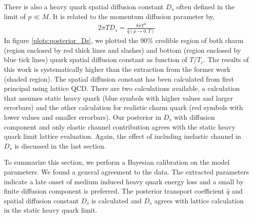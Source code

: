\documentclass[aps, prc, reprint, amsmath, groupedaddress, nofootinbib]{revtex4-1}
\begin{document}
There is also a heavy quark spatial diffusion constant $D_s$ often defined in the limit of $p\ll M$.
It is related to the momentum diffusion parameter by,
\begin{eqnarray}
2\pi T D_s = \frac{8\pi T^3}{\hat{q}(p\rightarrow 0, T)}
\end{eqnarray}
In figure \ref{plots:posterior_Ds}, we plotted the 90\% credible region of both charm (region enclosed by red thick lines and slashes) and bottom (region enclosed by blue tick lines) quark spatial diffusion constant as function of $T/T_c$.
The results of this work is systematically higher than the extraction from the former work (shaded region).
The spatial diffusion constant has been calculated from first principal using lattice QCD.
There are two calculations available, a calculation that assumes static heavy quark (blue symbols with higher values and larger errorbars) and the other calculation for realistic charm quark (red symbols with lower values and smaller errorbars).
Our posterior in $D_s$ with diffusion component and only elastic channel contribution agrees with the static heavy quark limit lattice evaluation.
Again, the effect of including inelastic channel in $D_s$ is discussed in the last section.

To summarize this section, we perform a Bayesian calibration on the model parameters. 
We found a general agreement to the data.
The extracted parameters indicate a late onset of medium induced heavy quark energy loss and a small by finite diffusion component is preferred.
The posterior transport coefficient $\hat{q}$ and spatial diffusion constant $D_s$ is calculated and $D_s$ agrees with lattice calculation in the static heavy quark limit. 
\end{document}
